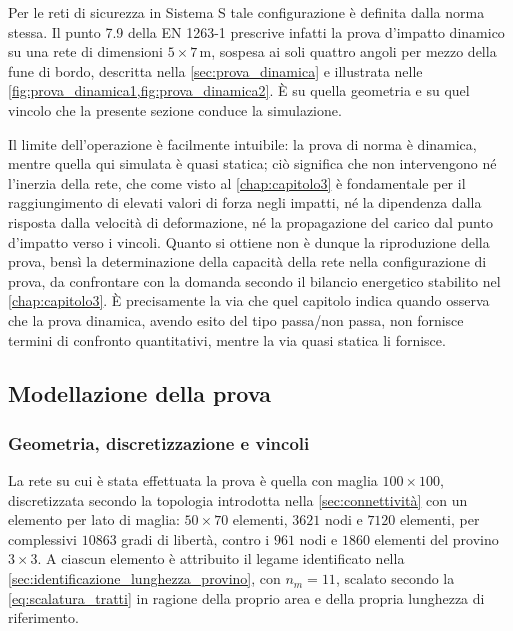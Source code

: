 Per le reti di sicurezza in Sistema S tale configurazione è definita dalla norma stessa. Il punto 7.9 della EN 1263-1 \cite{EN1263-1} prescrive infatti la prova d'impatto dinamico su una rete di dimensioni $5\times7\, \text{m}$, sospesa ai soli quattro angoli per mezzo della fune di bordo, descritta nella \cref{sec:prova_dinamica} e illustrata nelle \cref{fig:prova_dinamica1,fig:prova_dinamica2}. \`E su quella geometria e su quel vincolo che la presente sezione conduce la simulazione. 

Il limite dell'operazione è facilmente intuibile: la prova di norma è dinamica, mentre quella qui simulata è quasi statica; ciò significa che non intervengono né l'inerzia della rete, che come visto al \cref{chap:capitolo3} è fondamentale per il raggiungimento di elevati valori di forza negli impatti, né la dipendenza dalla risposta dalla velocità di deformazione, né la propagazione del carico dal punto d'impatto verso i vincoli. Quanto si ottiene non è dunque la riproduzione della prova, bensì la determinazione della capacità della rete nella configurazione di prova, da confrontare con la domanda secondo il bilancio energetico stabilito nel \cref{chap:capitolo3}. \`E precisamente la via che quel capitolo indica quando osserva che la prova dinamica, avendo esito del tipo passa/non passa, non fornisce termini di confronto quantitativi, mentre la via quasi statica li fornisce.

\subsection{Modellazione della prova}
\label{sec:modellazione_5x7}

\subsubsection{Geometria, discretizzazione e vincoli}
\label{sec:geometria_5x7}

La rete su cui è stata effettuata la prova è quella con maglia $100\times100$, discretizzata secondo la topologia introdotta nella \cref{sec:connettività} con un elemento per lato di maglia: $50\times70$ elementi, $3621$ nodi e $7120$ elementi, per complessivi $10863$ gradi di libertà, contro i $961$ nodi e $1860$ elementi del provino $3\times3$. A ciascun elemento è attribuito il legame identificato nella \cref{sec:identificazione_lunghezza_provino}, con $n_m = 11$, scalato secondo la \eqref{eq:scalatura_tratti} in ragione della proprio area e della propria lunghezza di riferimento. 

